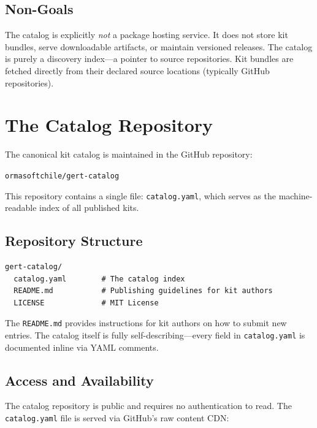 \subsection{Non-Goals}

The catalog is explicitly \emph{not} a package hosting service. It does not store kit bundles, serve downloadable artifacts, or maintain versioned releases. The catalog is purely a discovery index---a pointer to source repositories. Kit bundles are fetched directly from their declared source locations (typically GitHub repositories).

\section{The Catalog Repository}
\label{sec:catalog-repo}

The canonical kit catalog is maintained in the GitHub repository:

\begin{center}
\texttt{ormasoftchile/gert-catalog}
\end{center}

This repository contains a single file: \texttt{catalog.yaml}, which serves as the machine-readable index of all published kits.

\subsection{Repository Structure}

\begin{verbatim}
gert-catalog/
  catalog.yaml        # The catalog index
  README.md           # Publishing guidelines for kit authors
  LICENSE             # MIT License
\end{verbatim}

The \texttt{README.md} provides instructions for kit authors on how to submit new entries. The catalog itself is fully self-describing---every field in \texttt{catalog.yaml} is documented inline via YAML comments.

\subsection{Access and Availability}

The catalog repository is public and requires no authentication to read. The \texttt{catalog.yaml} file is served via GitHub's raw content CDN:


